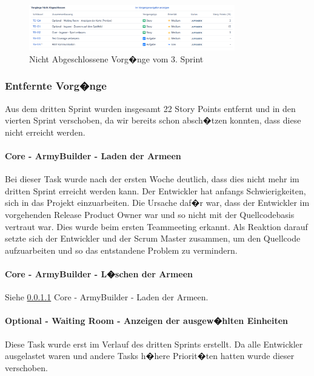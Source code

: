 \documentclass[12pt, titlepage]{scrartcl}
\begin{document}
				\begin{figure}[H] 
					\centering
					\includegraphics[width=0.8\textwidth]{Nicht_Abgeschlossene_Vorgaenge_Sprint_3.PNG}
					\caption{Nicht Abgeschlossene Vorg�nge vom 3. Sprint}
					\label{NichtAbgeschlosseneVorgaengeSprint3}
				\end{figure}
		\subsubsection{Entfernte Vorg�nge}
		Aus dem dritten Sprint wurden insgesamt 22 Story Points entfernt und in den vierten Sprint verschoben, da wir bereits schon absch�tzen konnten, dass diese nicht erreicht werden. 
			
			\paragraph{Core - ArmyBuilder - Laden der Armeen} \label{ProblemOne}Bei dieser Task wurde nach der ersten Woche deutlich, dass dies nicht mehr im dritten Sprint erreicht werden kann. Der Entwickler hat anfangs Schwierigkeiten, sich in das Projekt einzuarbeiten. Die Ursache daf�r war, dass der Entwickler im vorgehenden Release Product Owner war und so nicht mit der Quellcodebasis vertraut war. Dies wurde beim ersten Teammeeting erkannt. Als Reaktion darauf setzte sich der Entwickler und der Scrum Master zusammen, um den Quellcode aufzuarbeiten und so das entstandene Problem zu vermindern.
			
			\paragraph{Core - ArmyBuilder - L�schen der Armeen} Siehe \ref{ProblemOne} Core - ArmyBuilder - Laden der Armeen.
			
			\paragraph{Optional - Waiting Room - Anzeigen der ausgew�hlten Einheiten} Diese Task wurde erst im Verlauf des dritten Sprints erstellt. Da alle Entwickler ausgelastet waren und andere Tasks h�here Priorit�ten hatten wurde dieser verschoben.
			
\end{document}
